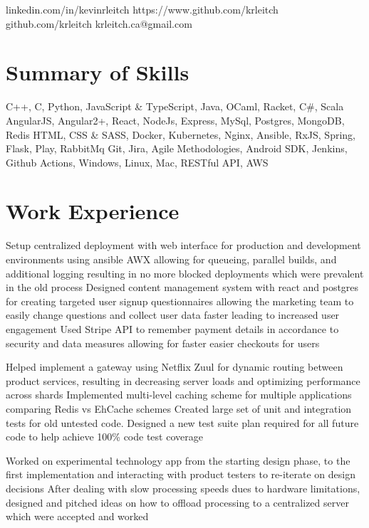 \documentclass{my_resume}
\begin{document}
        {linkedin.com/in/kevinrleitch}
        {https://www.github.com/krleitch}
        {github.com/krleitch}
        {krleitch.ca@gmail.com}

\section{Summary of Skills}
{C++, C, Python, JavaScript \& TypeScript, Java, OCaml, Racket, C\#, Scala}
{AngularJS, Angular2+, React, NodeJs, Express, MySql, Postgres, MongoDB, Redis HTML,
 CSS \& SASS, Docker, Kubernetes, Nginx, Ansible, RxJS, Spring, Flask, Play, RabbitMq}
{Git, Jira, Agile Methodologies, Android SDK, Jenkins, Github Actions, Windows, Linux, Mac, RESTful API, AWS}

\section{Work Experience}

\workitemsthree
{Setup centralized deployment with web interface for production and development environments using ansible AWX allowing for queueing,
 parallel builds, and additional logging resulting in no more blocked deployments which were prevalent in the old process}
{Designed content management system with react and postgres for creating targeted user signup questionnaires allowing the marketing team
 to easily change questions and collect user data faster leading to increased user engagement}
{Used Stripe API to remember payment details in accordance to security and data measures allowing for faster easier checkouts for users}

\workitemsthree
{Helped implement a gateway using Netflix Zuul for dynamic routing between product services,
 resulting in decreasing server loads and optimizing performance across shards}
{Implemented multi-level caching scheme for multiple applications comparing Redis vs EhCache schemes}
{Created large set of unit and integration tests for old untested code.
 Designed a new test suite plan required for all future code to help achieve 100\% code test coverage}

\workitemstwo
{Worked on experimental technology app from the starting design phase, to the first implementation and interacting
with product testers to re-iterate on design decisions}
{After dealing with slow processing speeds dues to hardware limitations, designed and pitched ideas on how to offload
processing to a centralized server which were accepted and worked }
\end{document}
